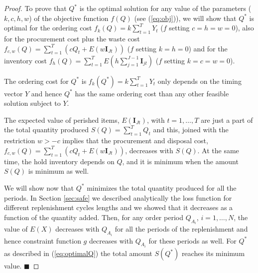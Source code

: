 \begin{proof}
To prove that $Q^*$ is the optimal solution for any value of the parameters ($k,c,h,w$) of the objective function $f(Q)$ (see (\ref{eq:obj})), we will show that $Q^*$ is optimal for the ordering cost $f_k(Q)= k\sum_{t=1}^T Y_t $  ($f$ setting  $c=h=w=0$), also for the procurement cost plus the waste cost $f_{c,w}(Q)=\sum_{t=1}^T \left(c Q_t+ E\left(w\boldsymbol{I}_{Jt}\right)\right)$ ($f$ setting $k=h=0$) and for the inventory cost $f_h(Q)=\sum_{t=1}^T E\left(h\sum_{j=1}^{J-1} \boldsymbol{I}_{jt} \right)$ ($f$ setting $k=c=w=0$).







The ordering cost for $Q^*$ is $f_k(Q^*)=k\sum\limits_{t=1}^{T}Y_t$ only depends on the timing vector $Y$ and hence $Q^*$ has the same ordering cost than any other feasible solution subject to  $Y$.

The expected value of perished items, $E\left(\boldsymbol{I}_{Jt}\right)$, with $t=1,\ldots,T$ are just a part of the total quantity produced $S(Q)=\sum\limits_{t=1}^{T}Q_t$ and this, joined with the restriction $w>-c$ implies that the procurement and disposal cost, $f_{c,w}(Q)=\sum_{t=1}^T \left(c Q_t+ E\left(w\boldsymbol{I}_{Jt}\right)\right)$, decreases with $S(Q)$. At the same time, the hold inventory depends on  $Q$, and it is minimum when the amount $S(Q)$ is minimum as well.

We will show now that $Q^*$ minimizes the total quantity produced for all the periods.
In Section \ref{sec:safe} we described analytically the loss function for different replenishment cycles lengths and we showed that it decreases as a function of the quantity added. Then, for any order period $Q_{A_i}$, $i=1,\ldots,N$, the value of  $E(X)$ decreases with $Q_{A_i}$ for all the periods of the replenishment and hence constraint function $g$ decreases with $Q_{A_i}$ for these periods as well. For $Q^*$ as described in (\ref{eq:optimalQ}) the total amount $S(Q^*)$ reaches its minimum value. $\blacksquare$


\end{proof}

